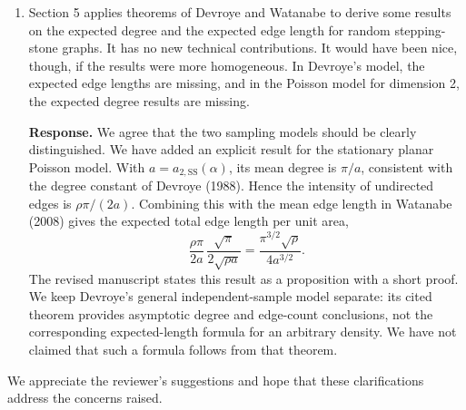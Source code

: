 \documentclass[11pt]{article}
\newcommand{\tb}[1]{\textcolor[HTML]{0000bb}{#1}}
\begin{document}
\begin{enumerate}
\newpage
\item \tb{Section 5 applies theorems of Devroye and Watanabe to derive
some results on the expected degree and the expected edge length for
random stepping-stone graphs. It has no new technical contributions.
It would have been nice, though, if the results were more homogeneous.
In Devroye's model, the expected edge lengths are missing, and in the
Poisson model for dimension 2, the expected degree results are missing.}

\textbf{Response.} We agree that the two sampling models should be
clearly distinguished. We have added an explicit result for the
stationary planar Poisson model. With
$a=a_{2,\mathrm{SS}}(\alpha)$, its mean degree is $\pi/a$,
consistent with the degree constant of Devroye (1988).
Hence the intensity of undirected edges is $\rho\pi/(2a)$.
Combining this with the mean edge length in
Watanabe (2008) gives the expected total edge length
per unit area,
\[
  \frac{\rho\pi}{2a}\,
  \frac{\sqrt{\pi}}{2\sqrt{\rho a}}
  =\frac{\pi^{3/2}\sqrt{\rho}}{4a^{3/2}}.
\]
The revised manuscript states this result as a proposition with a
short proof. We keep Devroye's general independent-sample model
separate: its cited theorem provides asymptotic degree and edge-count
conclusions, not the corresponding expected-length formula for an
arbitrary density. We have not claimed that such a formula follows
from that theorem.

\end{enumerate}

\noindent We appreciate the reviewer's suggestions and hope that these
clarifications address the concerns raised.
\end{document}
